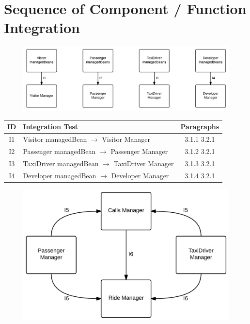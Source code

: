 \section{Sequence of Component / Function Integration}

\begin{figure}[!htbp]
\centering
\includegraphics[width=\textwidth]{cpt/img/ITDPComponentDiagramsTP1}
\end{figure}

\begin{table}[!htbp]
\begin{center}
\begin{tabular}[t]{c|p{}|c}

\textbf{ID} & \textbf{Integration Test} & \textbf{Paragraphs} \\
\hline
I1 & Visitor managedBean $\rightarrow$ Visitor Manager & 3.1.1  3.2.1 \\
\hline
I2 & Passenger managedBean $\rightarrow$ Passenger Manager & 3.1.2  3.2.1 \\
\hline
I3 & TaxiDriver managedBean $\rightarrow$ TaxiDriver Manager & 3.1.3  3.2.1 \\
\hline
I4 & Developer managedBean $\rightarrow$ Developer Manager & 3.1.4  3.2.1 \\
\hline
\end{tabular}
\end{center}
\end{table}

\begin{figure}[!htbp]
\centering
\includegraphics[width=\textwidth]{cpt/img/ITDPComponentDiagramsTP2}
\end{figure}


